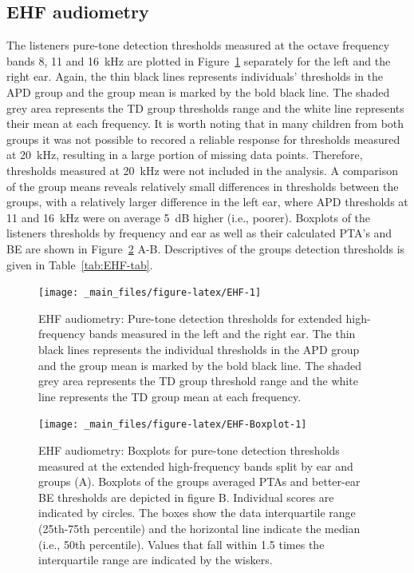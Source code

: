\documentclass[a4paper, twoside]{templates/ociamthesis}
\begin{document}
\hypertarget{ehf-audiometry}{%
\subsection{EHF audiometry}\label{ehf-audiometry}}

The listeners pure-tone detection thresholds measured at the octave frequency bands 8, 11 and 16~kHz are plotted in Figure~\ref{fig:EHF} separately for the left and the right ear. Again, the thin black lines represents individuals' thresholds in the APD group and the group mean is marked by the bold black line. The shaded grey area represents the TD group thresholds range and the white line represents their mean at each frequency. It is worth noting that in many children from both groups it was not possible to recored a reliable response for thresholds measured at 20~kHz, resulting in a large portion of missing data points. Therefore, thresholds measured at 20~kHz were not included in the analysis. A comparison of the group means reveals relatively small differences in thresholds between the groups, with a relatively larger difference in the left ear, where APD thresholds at 11 and 16~kHz were on average 5~dB higher (i.e., poorer). Boxplots of the listeners thresholds by frequency and ear as well as their calculated PTA's and BE are shown in Figure~\ref{fig:EHF-Boxplot} A-B. Descriptives of the groups detection thresholds is given in Table~\ref{tab:EHF-tab}.\\

\begin{figure}

{\centering \texttt{[image: \_main\_files/figure-latex/EHF-1]} 

}

\caption{EHF audiometry: Pure-tone detection thresholds for extended high-frequency bands measured in the left and the right ear. The thin black lines represents the individual thresholds in the APD group and the group mean is marked by the bold black line. The shaded grey area represents the TD group threshold range and the white line represents the TD group mean at each frequency.}\label{fig:EHF}
\end{figure}

\begin{figure}

{\centering \texttt{[image: \_main\_files/figure-latex/EHF-Boxplot-1]} 

}

\caption{EHF audiometry: Boxplots for pure-tone detection thresholds measured at the extended high-frequency bands split by ear and groups (A). Boxplots of the groups averaged PTAs and better-ear BE thresholds are depicted in figure B. Individual scores are indicated by circles. The boxes show the data interquartile range (25th-75th percentile) and the horizontal line indicate the median (i.e., 50th percentile). Values that fall within 1.5 times the interquartile range are indicated by the wiskers.}\label{fig:EHF-Boxplot}
\end{figure}
\end{document}
